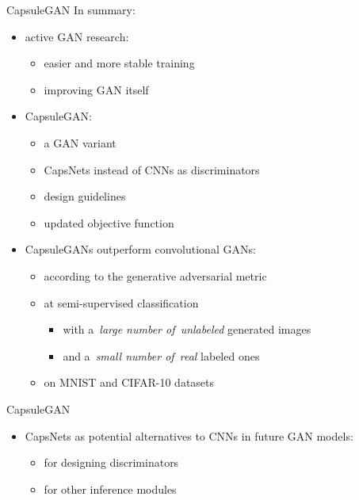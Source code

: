 \documentclass{beamer}
\newcommand{\colorcite}{\color{gray!35}}
\newcommand{\capsGANcitation}{(TODO)}
\begin{document}
  {
    \setbeamertemplate{frame footer}{\colorcite\capsGANcitation}

    \begin{frame}{CapsuleGAN}
      In summary:
      \pause
      \begin{itemize}[<+- | alert@+>]
        \item active GAN research:
          \begin{itemize}[<+- | alert@+>]
            \item easier and more stable training
            \item improving GAN itself
          \end{itemize}
        \item CapsuleGAN:
          \begin{itemize}[<+- | alert@+>]
            \item a GAN variant
            \item CapsNets instead of CNNs as discriminators
            \item design guidelines
            \item updated objective function
          \end{itemize}
        \item CapsuleGANs outperform convolutional GANs:
          \begin{itemize}[<+- | alert@+>]
            \item according to the generative adversarial metric
            \item at semi-supervised classification
              \begin{itemize}[<+- | alert@+>]
                \item with a~\emph{large number of~unlabeled} generated images
                \item and a~\emph{small number of~real} labeled ones
              \end{itemize}
            \item on MNIST and CIFAR-10 datasets
          \end{itemize}
      \end{itemize}
      \pause
    \end{frame}

    \begin{frame}{CapsuleGAN}
      \begin{itemize}[<+- | alert@+>]
        \item CapsNets as potential alternatives to CNNs in future GAN models:
          \begin{itemize}[<+- | alert@+>]
            \item for designing discriminators
            \item for other inference modules
          \end{itemize}
      \end{itemize}
      \pause


\end{frame}}
\end{document}
